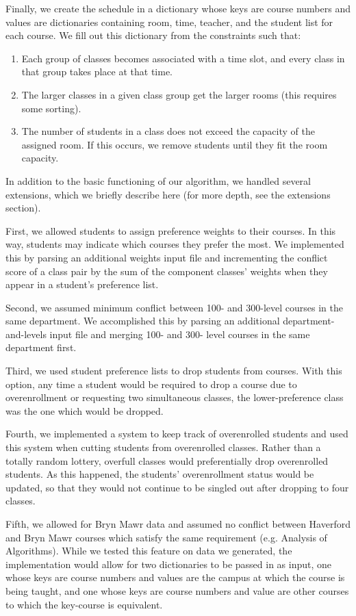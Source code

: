 \documentclass[11pt, oneside]{article}   	%
\begin{document}
Finally, we create the schedule in a dictionary whose keys are course numbers and values are dictionaries containing room, time, teacher, and the student list for each course. We fill out this dictionary from the constraints such that:

\begin{enumerate}
    \item Each group of classes becomes associated with a time slot, and every class in that group takes place at that time.
    \item The larger classes in a given class group get the larger rooms (this requires some sorting).
    \item The number of students in a class does not exceed the capacity of the assigned room. If this occurs, we remove students until they fit the room capacity.
\end{enumerate}

In addition to the basic functioning of our algorithm, we handled several extensions, which we briefly describe here (for more depth, see the extensions section).

 First, we allowed students to assign preference weights to their courses. In this way, students may indicate which courses they prefer the most. We implemented this by parsing an additional weights input file and incrementing the conflict score of a class pair by the sum of the component classes' weights when they appear in a student's preference list.

Second, we assumed minimum conflict between 100- and 300-level courses in the same department. We accomplished this by parsing an additional department-and-levels input file and merging 100- and 300- level courses in the same department first.

Third, we used student preference lists to drop students from courses. With this option, any time a student would be required to drop a course due to overenrollment or requesting two simultaneous classes, the lower-preference class was the one which would be dropped.

Fourth, we implemented a system to keep track of overenrolled students and used this system when cutting students from overenrolled classes. Rather than a totally random lottery, overfull classes would preferentially drop overenrolled students. As this happened, the students' overenrollment status would be updated, so that they would not continue to be singled out after dropping to four classes.

Fifth, we allowed for Bryn Mawr data and assumed no conflict between Haverford and Bryn Mawr courses which satisfy the same requirement (e.g. Analysis of Algorithms).  While we tested this feature on data we generated, the implementation would allow for two dictionaries to be passed in as input, one whose keys are course numbers and values are the campus at which the course is being taught, and one whose keys are course numbers and value are other courses to which the key-course is equivalent.
\end{document}
